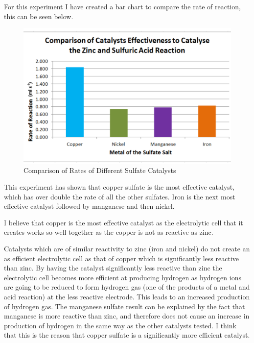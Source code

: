  For this experiment I have created a bar chart to compare the rate of reaction, this can be seen below.

\begin{figure}[H]
    \includegraphics[width=\textwidth]{./Analysis/Images/4DifferentCatalysts/Comparison.pdf}
    \caption{Comparison of Rates of Different Sulfate Catalysts} \label{fig:ComparisonCat}
\end{figure}

This experiment has shown that copper sulfate is the most effective catalyst, which has over double the rate of all the other sulfates. Iron is the next most effective catalyst followed by manganese and then nickel.

I believe that copper is the most effective catalyst as the electrolytic cell that it creates works so well together as the copper is not as reactive as zinc. 

Catalysts which are of similar reactivity to zinc (iron and nickel) do not create an as efficient electrolytic cell as that of copper which is significantly less reactive than zinc. By having the catalyst significantly less reactive than zinc the electrolytic cell becomes more efficient at producing hydrogen as hydrogen ions are going to be reduced to form hydrogen gas (one of the products of a metal and acid reaction) at the less reactive electrode. This leads to an increased production of hydrogen gas. The manganese sulfate result can be explained by the fact that manganese is more reactive than zinc, and therefore does not cause an increase in production of hydrogen in the same way as the other catalysts tested. I think that this is the reason that copper sulfate is a significantly more efficient catalyst.

